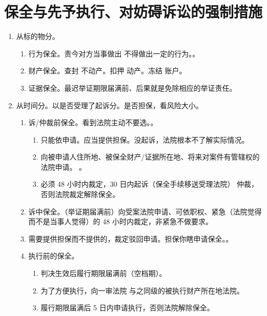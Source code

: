 \section{保全与先予执行、对妨碍诉讼的强制措施}
\begin{enumerate}
  \item 从标的物分。
        \begin{enumerate}
          \item 行为保全。责今对方当事做出 \hz 不得做出一定的行为。。
          \item 财产保全。查封 \yjt 不动产。扣押 \yjt 动产。冻结 \yjt 账户。
          \item 证据保全。最迟举证期限届满前、后果就是免除相应的举证责任。
        \end{enumerate}
  \item 从时间分。以是否受理了起诉分。是否担保，看风险大小。
        \begin{enumerate}
          \item 诉/仲裁前保全。看到法院主动不要选。。
                \begin{enumerate}
                  \item \yi 只能依申请。\er 应当提供担保。没起诉，法院根本不了解实际情况。
                  \item 向被申请人住所地、被保全财产/证据所在地、将来对案件有管辖权的法院申请。
                        。
                  \item 必须 48 小时内裁定，30 日内起诉（保全手续移送受理法院） \hz 仲裁，否则法院裁定解除保全。
                \end{enumerate}
          \item 诉中保全。（举证期届满前）向受案法院申请、可依职权、紧急（法院觉得而不是当事人觉得）的 48 小时内裁定，非紧急不做要求。
          \item \sjt 需要提供担保而不提供的，裁定驳回申请。担保你瞎申请保全。。
          \item 执行前的保全。
                \begin{enumerate}
                  \item 判决生效后履行期限届满前（空档期）。
                  \item 为了方便执行，向一审法院 \hz 与之同级的被执行财产所在地法院。
                  \item 履行期限届满后 5 日内申请执行，否则法院解除保全。

\end{enumerate}
\end{enumerate}
\end{enumerate}

